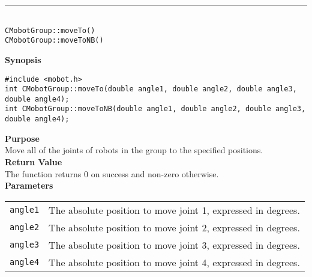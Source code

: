 \noindent
\vspace{5pt}
\rule{4.5in}{0.015in}\\
\noindent
{\LARGE \texttt{CMobotGroup::moveTo()}}\\
{\LARGE \texttt{CMobotGroup::moveToNB()}}\\
{}

\noindent
{\bf Synopsis}
\vspace{-8pt}
\begin{verbatim}
#include <mobot.h>
int CMobotGroup::moveTo(double angle1, double angle2, double angle3, double angle4);
int CMobotGroup::moveToNB(double angle1, double angle2, double angle3, double angle4);
\end{verbatim}

\noindent
{\bf Purpose}\\
Move all of the joints of robots in the group to the specified positions.\\

\noindent
{\bf Return Value}\\
The function returns 0 on success and non-zero otherwise.\\

\noindent
{\bf Parameters}\\
\vspace{-0.1in}
\begin{description}
\item               
\begin{tabular}{p{15 mm}p{105 mm}}
\texttt{angle1} & The absolute position to move joint 1, expressed in degrees. \\
\texttt{angle2} & The absolute position to move joint 2, expressed in degrees. \\
\texttt{angle3} & The absolute position to move joint 3, expressed in degrees. \\
\texttt{angle4} & The absolute position to move joint 4, expressed in degrees. \\
\end{tabular}
\end{description}
\noindent

